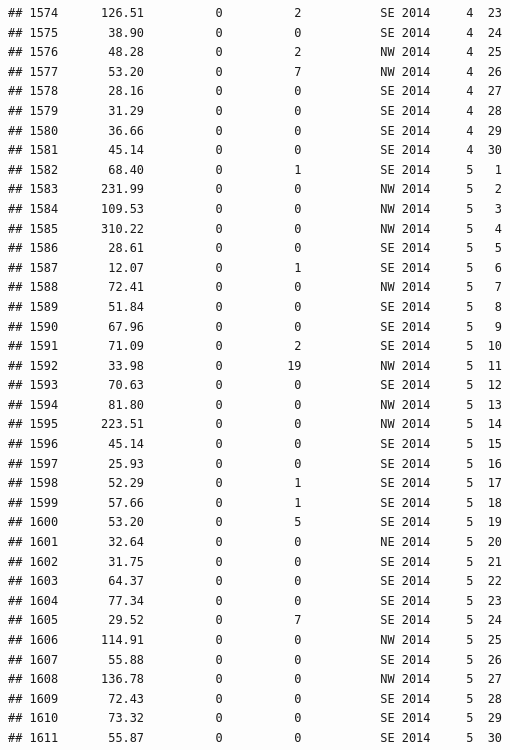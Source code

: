 \documentclass[
]{article}
\begin{document}
\begin{verbatim}
## 1574      126.51          0          2           SE 2014     4  23
## 1575       38.90          0          0           SE 2014     4  24
## 1576       48.28          0          2           NW 2014     4  25
## 1577       53.20          0          7           NW 2014     4  26
## 1578       28.16          0          0           SE 2014     4  27
## 1579       31.29          0          0           SE 2014     4  28
## 1580       36.66          0          0           SE 2014     4  29
## 1581       45.14          0          0           SE 2014     4  30
## 1582       68.40          0          1           SE 2014     5   1
## 1583      231.99          0          0           NW 2014     5   2
## 1584      109.53          0          0           NW 2014     5   3
## 1585      310.22          0          0           NW 2014     5   4
## 1586       28.61          0          0           SE 2014     5   5
## 1587       12.07          0          1           SE 2014     5   6
## 1588       72.41          0          0           NW 2014     5   7
## 1589       51.84          0          0           SE 2014     5   8
## 1590       67.96          0          0           SE 2014     5   9
## 1591       71.09          0          2           SE 2014     5  10
## 1592       33.98          0         19           NW 2014     5  11
## 1593       70.63          0          0           SE 2014     5  12
## 1594       81.80          0          0           NW 2014     5  13
## 1595      223.51          0          0           NW 2014     5  14
## 1596       45.14          0          0           SE 2014     5  15
## 1597       25.93          0          0           SE 2014     5  16
## 1598       52.29          0          1           SE 2014     5  17
## 1599       57.66          0          1           SE 2014     5  18
## 1600       53.20          0          5           SE 2014     5  19
## 1601       32.64          0          0           NE 2014     5  20
## 1602       31.75          0          0           SE 2014     5  21
## 1603       64.37          0          0           SE 2014     5  22
## 1604       77.34          0          0           SE 2014     5  23
## 1605       29.52          0          7           SE 2014     5  24
## 1606      114.91          0          0           NW 2014     5  25
## 1607       55.88          0          0           SE 2014     5  26
## 1608      136.78          0          0           NW 2014     5  27
## 1609       72.43          0          0           SE 2014     5  28
## 1610       73.32          0          0           SE 2014     5  29
## 1611       55.87          0          0           SE 2014     5  30

\end{verbatim}
\end{document}
